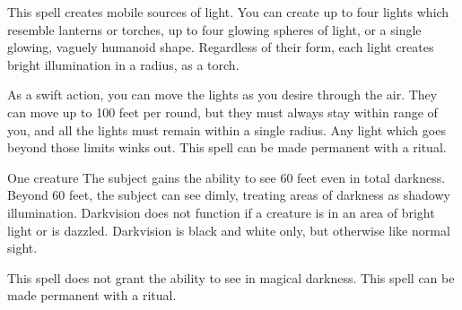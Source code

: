 \begin{comment}
\subsubsection{D}
\end{comment}

\spelldur{\durshort \dismissable}
\spellline
\spelleffect This spell creates mobile sources of light. You can create up to four lights which resemble lanterns or torches, up to four glowing spheres of light, or a single glowing, vaguely humanoid shape. Regardless of their form, each light creates bright illumination in a \areamed radius, as a torch.

As a swift action, you can move the lights as you desire through the air. They can move up to 100 feet per round, but they must always stay within range of you, and all the lights must remain within a single \areamed radius. Any light which goes beyond those limits winks out.
\spellnotes This spell can be made permanent with a  ritual.

\spellrng{\rngtouch}
\spelldur{\durlong}
\begin{spelltarget}{One creature}
    \spelleffect The subject gains the ability to see 60 feet even in total darkness. Beyond 60 feet, the subject can see dimly, treating areas of darkness as shadowy illumination. Darkvision does not function if a creature is in an area of bright light or is dazzled. Darkvision is black and white only, but otherwise like normal sight.
\end{spelltarget}
\spellnotes This spell does not grant the ability to see in magical darkness. This spell can be made permanent with a  ritual.

